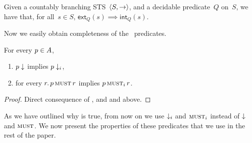 \begin{proposition}%
  \label{prop:ext-impl-int}
  Given a countably branching STS~$\langle S, \to \rangle$, and a decidable predicate~$Q$
  on~$S$, we have that, for all~$s \in S$, $\mathsf{ext}_Q(s) \implies
  \mathsf{int}_Q(s).$
\end{proposition}
\noindent
Now we easily obtain completeness of the \intentional\ predicates.
\begin{corollary}
\label{cor:inductive-char-must}\label{cor:inductive-char-conv}
  For every $p \in A$,
  \begin{enumerate}
  \item $p \downarrow $ implies $p \downarrow_i$,
  \item for every $r . \, p \operatorname{\textsc{must}} r$ implies $p \operatorname{\textsc{must}}_i r$.
  \end{enumerate}
\end{corollary}
\begin{proof}
  Direct consequence of , and
   and
   above.%
\end{proof}






As we have outlined why  is true,
from now on we use $\downarrow_i$ and $\operatorname{\textsc{must}}_i$ instead of $\downarrow$ and $\operatorname{\textsc{must}}$.
We now  present the properties of these predicates that we use
in the rest of the paper.

